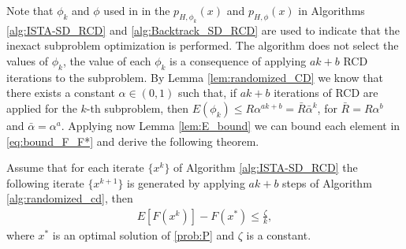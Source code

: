\documentclass[11pt]{article}
\numberwithin{equation}{section}
\begin{document}
Note that $\phi_k$  and $\phi$ used in in the $p_{H,\phi_k}(x)$ and $p_{H,\phi}(x)$ in Algorithms \ref{alg:ISTA-SD_RCD} and \ref{alg:Backtrack_SD_RCD} are used to indicate 
that the inexact subproblem optimization is performed. The algorithm does not select the values of $\phi_k$, the value of each $\phi_k$ is a consequence of applying $ak+b$ RCD iterations to the subproblem.  
By Lemma \ref{lem:randomized_CD} we know that there exists a constant $\alpha\in (0, 1)$ such that, if $ak+b$ iterations of RCD are applied for the $k$-th subproblem, then $E(\phi_k)\leq R \alpha^{ak+b}=\bar R \bar \alpha^k$, for $\bar R=R\alpha^b$ and $\bar \alpha = \alpha^a$. Applying now Lemma \ref{lem:E_bound}
we can bound each element in \eqref{eq:bound_F_F*} and derive the following theorem. 
\begin{theorem}\label{th:inexact_conv_rate_rand}
Assume that for each iterate $\{x^k\}$ of  Algorithm \ref{alg:ISTA-SD_RCD}  the following iterate $\{x^{k+1}\}$   is generated by applying $ak+b$ steps of Algorithm \ref{alg:randomized_cd}, then
\begin{align*}
    E[F(x^k)] - F(x^*) \leq \frac{\zeta}{k},
\end{align*}
where $x^*$ is an optimal solution of \eqref{prob:P} and $\zeta$ is a constant.
\end{theorem}
\end{document}
